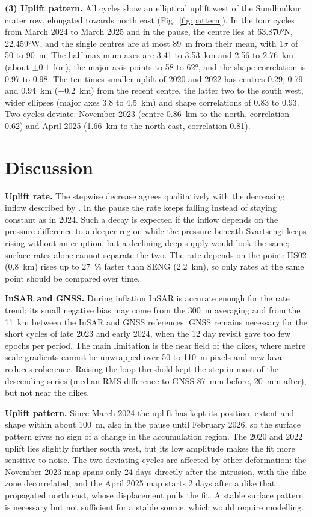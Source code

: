 \documentclass[10pt,a4paper,twocolumn]{article}
\begin{document}
\textbf{(3) Uplift pattern.} All cycles show an elliptical uplift west of the Sundhnúkur crater row, elongated towards north east (Fig.~\ref{fig:pattern}). In the four cycles from March 2024 to March 2025 and in the pause, the centre lies at \ang{63.870}N, \ang{22.459}W, and the single centres are at most 89~m from their mean, with $1\sigma$ of 50 to 90~m. The half maximum axes are 3.41 to 3.53~km and 2.56 to 2.76~km (about $\pm 0.1$~km), the major axis points to 58 to \ang{62}, and the shape correlation is 0.97 to 0.98. The ten times smaller uplift of 2020 and 2022 has centres 0.29, 0.79 and 0.94~km ($\pm 0.2$~km) from the recent centre, the latter two to the south west, wider ellipses (major axes 3.8 to 4.5~km) and shape correlations of 0.83 to 0.93. Two cycles deviate: November 2023 (centre 0.86~km to the north, correlation 0.62) and April 2025 (1.66~km to the north east, correlation 0.81).

\section{Discussion}
\label{sec:discussion}

\textbf{Uplift rate.} The stepwise decrease agrees qualitatively with the decreasing inflow described by \citet{parks2025}. In the pause the rate keeps falling instead of staying constant as in 2024. Such a decay is expected if the inflow depends on the pressure difference to a deeper region while the pressure beneath Svartsengi keeps rising without an eruption, but a declining deep supply would look the same; surface rates alone cannot separate the two. The rate depends on the point: HS02 (0.8~km) rises up to 27~\% faster than SENG (2.2~km), so only rates at the same point should be compared over time.

\textbf{InSAR and GNSS.} During inflation InSAR is accurate enough for the rate trend; its small negative bias may come from the 300~m averaging and from the 11~km between the InSAR and GNSS references. GNSS remains necessary for the short cycles of late 2023 and early 2024, when the 12 day revisit gave too few epochs per period. The main limitation is the near field of the dikes, where metre scale gradients cannot be unwrapped over 50 to 110~m pixels and new lava reduces coherence. Raising the loop threshold kept the step in most of the descending series (median RMS difference to GNSS 87~mm before, 20~mm after), but not near the dikes.

\textbf{Uplift pattern.} Since March 2024 the uplift has kept its position, extent and shape within about 100~m, also in the pause until February 2026, so the surface pattern gives no sign of a change in the accumulation region. The 2020 and 2022 uplift lies slightly further south west, but its low amplitude makes the fit more sensitive to noise. The two deviating cycles are affected by other deformation: the November 2023 map spans only 24 days directly after the intrusion, with the dike zone decorrelated, and the April 2025 map starts 2 days after a dike that propagated north east, whose displacement pulls the fit. A stable surface pattern is necessary but not sufficient for a stable source, which would require modelling.
\end{document}
